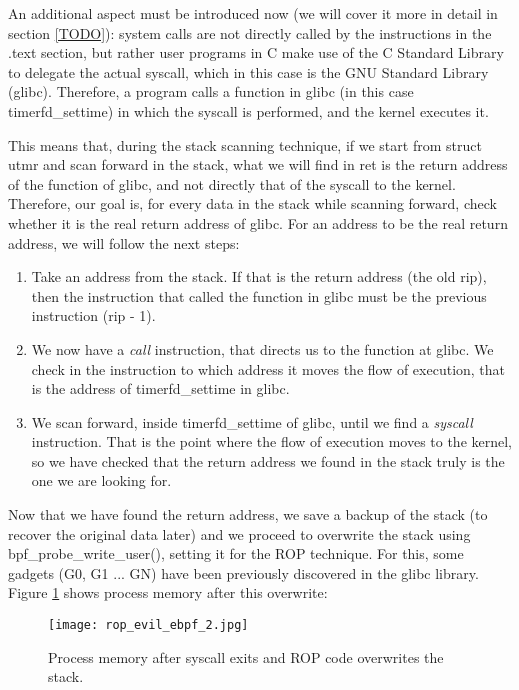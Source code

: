 An additional aspect must be introduced now (we will cover it more in detail in section \ref{TODO}): system calls are not directly called by the instructions in the .text section, but rather user programs in C make use of the C Standard Library to delegate the actual syscall, which in this case is the GNU Standard Library (glibc)\cite{glibc}. Therefore, a program calls a function in glibc (in this case timerfd\_settime) in which the syscall is performed, and the kernel executes it.

This means that, during the stack scanning technique, if we start from struct utmr and scan forward in the stack, what we will find in ret is the return address of the function of glibc, and not directly that of the syscall to the kernel. Therefore, our goal is, for every data in the stack while scanning forward, check whether it is the real return address of glibc. For an address to be the real return address, we will follow the next steps:
\begin{enumerate}
\item Take an address from the stack. If that is the return address (the old rip), then the instruction that called the function in glibc must be the previous instruction (rip - 1).
\item We now have a \textit{call} instruction, that directs us to the function at glibc. We check in the instruction to which address it moves the flow of execution, that is the address of timerfd\_settime in glibc.
\item We scan forward, inside timerfd\_settime of glibc, until we find a \textit{syscall} instruction. That is the point where the flow of execution moves to the kernel, so we have checked that the return address we found in the stack truly is the one we are looking for.
\end{enumerate}

Now that we have found the return address, we save a backup of the stack (to recover the original data later) and we proceed to overwrite the stack using bpf\_probe\_write\_user(), setting it for the ROP technique. For this, some gadgets (G0, G1 ... GN) have been previously discovered in the glibc library. Figure \ref{fig:rop_evil_ebpf_2} shows process memory after this overwrite:

\begin{figure}[H]
	\centering
	\texttt{[image: rop\_evil\_ebpf\_2.jpg]}
	\caption{Process memory after syscall exits and ROP code overwrites the stack.}
	\label{fig:rop_evil_ebpf_2}
\end{figure}

